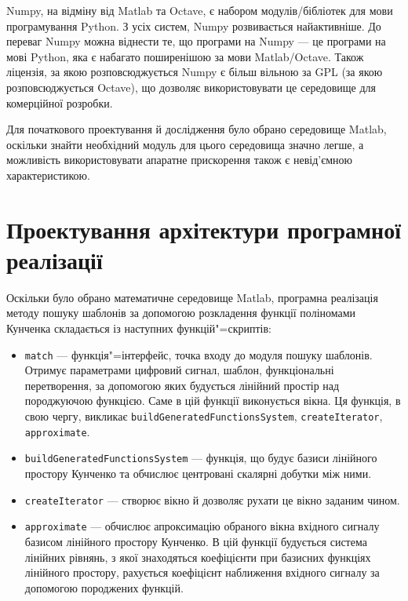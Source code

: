     Numpy, на відміну від Matlab та Octave, є набором модулів/бібліотек для мови програмування Python.
    З усіх систем, Numpy розвивається найактивніше.
    До переваг Numpy можна віднести те, що програми на Numpy --- це програми на мові Python, яка є набагато
    поширенішою за мови Matlab/Octave.
    Також ліцензія, за якою розповсюджується Numpy є більш вільною за GPL (за якою розповсюджується Octave), що
    дозволяє використовувати це середовище для комерційної розробки.

    Для початкового проектування й дослідження було обрано середовище Matlab, оскільки знайти необхідний модуль для
    цього середовища значно легше, а можливість використовувати апаратне прискорення також є невід’ємною
    характеристикою.
\section{Проектування архітектури програмної реалізації}
    Оскільки було обрано математичне середовище Matlab, програмна реалізація методу пошуку шаблонів за допомогою
    розкладення функції поліномами Кунченка складається із наступних функцій"=скриптів:
    \begin{itemize}
        \item \verb'match' --- функція"=інтерфейс, точка входу до модуля пошуку шаблонів.
            Отримує параметрами цифровий сигнал, шаблон, функціональні перетворення, за допомогою яких будується
            лінійний простір над породжуючою функцією.
            Саме в цій функції виконується  вікна.
            Ця функція, в свою чергу, викликає \verb'buildGeneratedFunctionsSystem', \verb'createIterator',
            \verb'approximate'.
        \item \verb'buildGeneratedFunctionsSystem' --- функція, що будує базиси лінійного простору Кунченко та
            обчислює центровані скалярні добутки між ними.
        \item \verb'createIterator' --- створює вікно й дозволяє рухати це вікно заданим чином.
        \item \verb'approximate' --- обчислює апроксимацію обраного вікна вхідного сигналу базисом лінійного простору
            Кунченко.
            В цій функції будується система лінійних рівнянь, з якої знаходяться коефіцієнти при базисних функціях
            лінійного простору, рахується коефіцієнт наближення вхідного сигналу за допомогою породжених функцій.
    \end{itemize}

